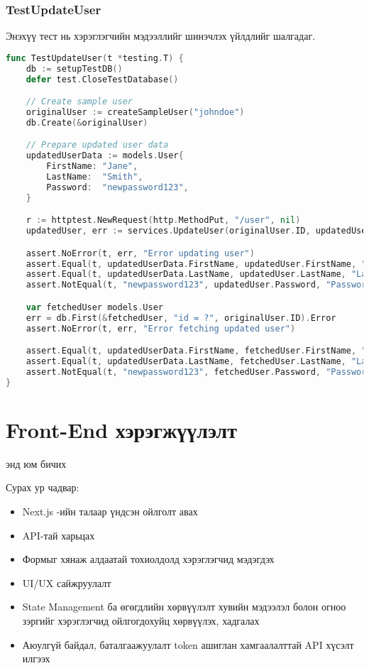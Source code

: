\subsubsection{TestUpdateUser}

Энэхүү тест нь хэрэглэгчийн мэдээллийг шинэчлэх үйлдлийг шалгадаг.

\begin{lstlisting}[language=Go, caption=Test Update User Function, frame=single]
func TestUpdateUser(t *testing.T) {
    db := setupTestDB()
    defer test.CloseTestDatabase()

    // Create sample user
    originalUser := createSampleUser("johndoe")
    db.Create(&originalUser)

    // Prepare updated user data
    updatedUserData := models.User{
        FirstName: "Jane",
        LastName:  "Smith",
        Password:  "newpassword123",
    }

    r := httptest.NewRequest(http.MethodPut, "/user", nil)
    updatedUser, err := services.UpdateUser(originalUser.ID, updatedUserData, r)

    assert.NoError(t, err, "Error updating user")
    assert.Equal(t, updatedUserData.FirstName, updatedUser.FirstName, "First name mismatch")
    assert.Equal(t, updatedUserData.LastName, updatedUser.LastName, "Last name mismatch")
    assert.NotEqual(t, "newpassword123", updatedUser.Password, "Password should be hashed")

    var fetchedUser models.User
    err = db.First(&fetchedUser, "id = ?", originalUser.ID).Error
    assert.NoError(t, err, "Error fetching updated user")

    assert.Equal(t, updatedUserData.FirstName, fetchedUser.FirstName, "First name mismatch in database")
    assert.Equal(t, updatedUserData.LastName, fetchedUser.LastName, "Last name mismatch in database")
    assert.NotEqual(t, "newpassword123", fetchedUser.Password, "Password should be hashed in database")
}
\end{lstlisting}
\pagebreak

\section{Front-End хэрэгжүүлэлт}
энд юм бичих

Сурах ур чадвар:
\begin{itemize}
	\item Next.js -ийн талаар үндсэн ойлголт авах
	\item API-тай харьцах
	\item Формыг хянаж алдаатай тохиолдолд хэрэглэгчид мэдэгдэх
	\item UI/UX сайжруулалт
	\item State Management ба өгөгдлийн хөрвүүлэлт хувийн мэдээлэл болон огноо зэргийг хэрэглэгчид ойлгогдохуйц хөрвүүлэх, хадгалах
	\item Аюулгүй байдал, баталгаажуулалт token ашиглан хамгаалалттай API хүсэлт илгээх
\end{itemize}

